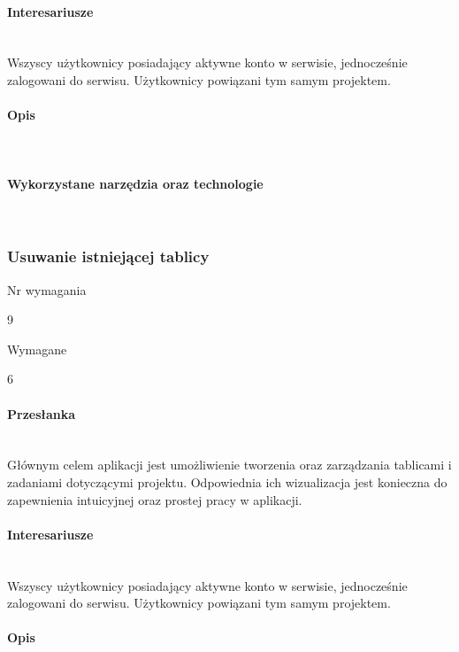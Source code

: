 \documentclass[eng,printmode]{mgr}
\begin{document}
\paragraph{Interesariusze}\ \\
Wszyscy użytkownicy posiadający aktywne konto w serwisie, jednocześnie zalogowani do serwisu. Użytkownicy powiązani tym samym projektem.

\paragraph{Opis}\ \\

\paragraph{Wykorzystane narzędzia oraz technologie}\ \\
\newpage

\subsubsection{Usuwanie istniejącej tablicy}
\begin{labeling}{Nr wymagania}
\item [Nr wymagania:] 9
\item [Typ:] Wymagane
\item [Powiązania:] 6
\end{labeling}

\paragraph{Przesłanka}\ \\
Głównym celem aplikacji jest umożliwienie tworzenia oraz zarządzania tablicami i zadaniami dotyczącymi projektu. Odpowiednia ich wizualizacja jest konieczna do zapewnienia intuicyjnej oraz prostej pracy w aplikacji.

\paragraph{Interesariusze}\ \\
Wszyscy użytkownicy posiadający aktywne konto w serwisie, jednocześnie zalogowani do serwisu. Użytkownicy powiązani tym samym projektem.

\paragraph{Opis}\ \\
\newpage
\end{document}
